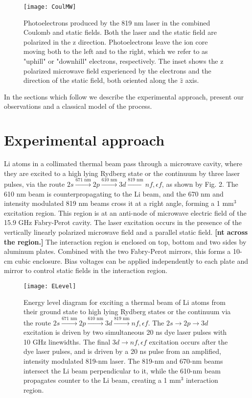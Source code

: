 \documentclass[aps,pra,preprint,groupedaddress]{revtex4-1}
\begin{document}
\begin{figure}
	\texttt{[image: CoulMW]}
	\caption{Photoelectrons produced by the 819 nm laser in the combined Coulomb and static fields. Both the laser and the static field are polarized in the z direction. Photoelectrons leave the ion core moving both to the left and to the right, which we refer to as "uphill" or "downhill" electrons, respectively. The inset shows the z polarized microwave field experienced by the electrons and the direction of the static field, both oriented along the $\hat{z}$ axis.}
	\label{fig:CoulMW}
\end{figure}
In the sections which follow we describe the experimental approach, present our observations and a classical model of the process.


\section{\label{sec:exp} Experimental approach}


Li atoms in a collimated thermal beam pass through a microwave cavity, where they are excited to a high lying Rydberg state or the continuum by three laser pulses, via the route $2s \xrightarrow{\text{671 nm}} 2p \xrightarrow{\text{610 nm}} 3d \xrightarrow{\text{819 nm}} nf, \epsilon f$, as shown by Fig. 2. The 610 nm beam is counterpropagating to the Li beam, and the 670 nm and intensity modulated 819 nm beams cross it at a right angle, forming a 1 mm$^3$ excitation region. This region is at an anti-node of microwave electric field of the 15.9 GHz Fabry-Perot cavity. The laser excitation occurs in the presence of the vertically linearly polarized microwave field and a parallel static field. \textbf{[nt across the region.]} The interaction region is enclosed on top, bottom and two sides by aluminum plates. Combined with the two Fabry-Perot mirrors, this forms a 10-cm cubic enclosure. Bias voltages can be applied independently to each plate and mirror to control static fields in the interaction region.


\begin{figure}
	\texttt{[image: ELevel]}
	\caption{Energy level diagram for exciting a thermal beam of Li atoms from their ground state to high lying Rydberg states or the continuum via the route $2s \xrightarrow{\text{671 nm}} 2p \xrightarrow{\text{610 nm}} 3d \xrightarrow{\text{819 nm}} nf, \epsilon f$. The $2s \rightarrow 2p \rightarrow 3d$ excitation is driven by two simultaneous 20 ns dye laser pulses with 10 GHz linewidths. The final $3d \rightarrow nf, \epsilon f$ excitation occurs after the dye laser pulses, and is driven by a 20 ns pulse from an amplified, intensity modulated 819-nm laser. The 819-nm and 670-nm beams intersect the Li beam perpendicular to it, while the 610-nm beam propagates counter to the Li beam, creating a 1 mm$^3$ interaction region.}
	\label{fig:ELev}
\end{figure}
\end{document}

